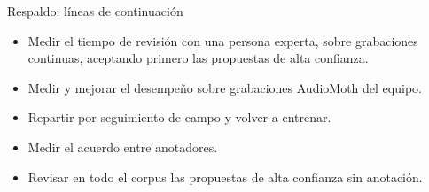 \documentclass[aspectratio=169,10pt,t]{beamer}
\begin{document}
\begin{frame}{Respaldo: líneas de continuación}
  \vspace{8mm}
  \begin{itemize}\setlength{\itemsep}{4mm}
    \item Medir el tiempo de revisión con una persona experta, sobre grabaciones continuas, aceptando primero las propuestas de alta confianza.
    \item Medir y mejorar el desempeño sobre grabaciones AudioMoth del equipo.
    \item Repartir por seguimiento de campo y volver a entrenar.
    \item Medir el acuerdo entre anotadores.
    \item Revisar en todo el corpus las propuestas de alta confianza sin anotación.
  \end{itemize}
\end{frame}
\end{document}
